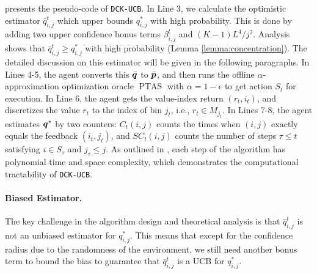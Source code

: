  presents the pseudo-code of \texttt{DCK-UCB}. In Line 3, we calculate the optimistic estimator $\bar q_{i,j}^t$ which upper bounds $q^*_{i,j}$ with high probability.
%
This is done by adding two upper confidence bonus terms $\beta_{i,j}^t$ and $(K-1)L^4/j^2$.
%
Analysis shows that $\bar q_{i,j}^t \ge q^*_{i,j}$ with high probability (Lemma \ref{lemma:concentration}). The detailed discussion on this estimator will be given in the following paragraphs.
%
In Lines 4-5, the agent converts this $\bar {{\bm{q}}}$ to $\bar {{\bm{p}}}$, and then runs the offline $\alpha$-approximation optimization oracle $\operatorname{PTAS}$ with $\alpha = 1 - \epsilon$ to get action $S_t$ for execution.
%
In Line 6, the agent gets the value-index return $(r_t, i_t)$, and discretizes the value $r_t$ to the index of bin $j_t$, i.e., $r_t \in M_{j_t}$.
%
In Lines 7-8, the agent estimates ${\bm{q}}^*$ by two counters: $C_t(i,j)$ counts the times when $(i,j)$ exactly equals the feedback $(i_t,j_t)$, and $SC_t(i,j)$ counts the number of steps $\tau \le t$ satisfying $i \in S_\tau$ and $j_\tau \le j$. As outlined in , each step of the algorithm has polynomial time and space complexity, which demonstrates the computational tractability of \texttt{DCK-UCB}. 


\paragraph{Biased Estimator.} 


The key challenge in the algorithm design and theoretical analysis is that $\hat q_{i,j}^t$ is not an unbiased estimator for $q_{i,j}^*$. This means that except for the confidence radius due to the randomness of the environment, we still need another bonus term to bound the bias to guarantee that $\bar q_{i,j}^t$ is a UCB for $q_{i,j}^*$. 
%

